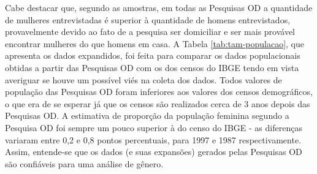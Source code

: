 \begin{table}[htb]
\end{table}

Cabe destacar que, segundo as amostras, em todas as Pesquisas OD a quantidade de mulheres entrevistadas é superior à quantidade de homens entrevistados, provavelmente devido ao fato de a pesquisa ser domiciliar e ser mais provável encontrar mulheres do que homens em casa.
A Tabela \ref{tab:tam-populacao}, que apresenta os dados expandidos, foi feita para comparar os dados populacionais obtidas a partir das Pesquisas OD com os dos censos do IBGE tendo em vista averiguar se houve um possível viés na coleta dos dados.
Todos valores de população das Pesquisas OD foram inferiores aos valores dos censos demográficos, o que era de se esperar já que os censos são realizados cerca de 3 anos depois das Pesquisas OD.
A estimativa de proporção da população feminina segundo a Pesquisa OD foi sempre um pouco superior à do censo do IBGE - as diferenças variaram entre 0,2 e 0,8 pontos percentuais, para 1997 e 1987 respectivamente.
Assim, entende-se que os dados (e suas expansões) gerados pelas Pesquisas OD são confiáveis para uma análise de gênero.


